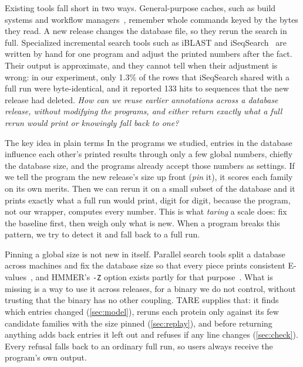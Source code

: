 \documentclass[letterpaper,twocolumn,10pt]{article}
\theoremstyle{definition}
\newcommand{\sys}{TARE\xspace}
\newcommand{\sys}{PARE\xspace}
\begin{document}
Existing tools fall short in two ways. General\nobreakdash-purpose caches, such as build systems and workflow
managers~\cite{curtsinger2022riker,xie2026incr,shiptoski2023processcache,ditommaso2017nextflow,molder2021snakemake},
remember whole commands keyed by the bytes they read. A new release changes the database file, so they rerun the
search in full. Specialized incremental search tools such as iBLAST and iSeqSearch~\cite{dash2021iblast,yoo2025iseqsearch}
are written by hand for one program and adjust the printed numbers after the fact. Their output is approximate, and
they cannot tell when their adjustment is wrong: in our experiment, only 1.3\% of the rows that iSeqSearch shared
with a full run were byte\nobreakdash-identical, and it reported 133 hits to sequences that the new release had deleted.
\textit{How can we reuse earlier annotations across a database release, without modifying the programs, and either
return exactly what a full rerun would print or knowingly fall back to one?}

\begin{plainbox}{The key idea in plain terms}
In the programs we studied, entries in the database influence each other's printed results through only a few
global numbers, chiefly the database size, and the programs already accept those numbers as settings. If we tell
the program the new release's size up front (\textit{pin} it), it scores each family on its own merits. Then we can
rerun it on a small subset of the database and it prints exactly what a full run would print, digit for digit,
because the program, not our wrapper, computes every number. This is what \textit{taring} a scale does: fix the
baseline first, then weigh only what is new. When a program breaks this pattern, we try to detect it and fall back to a
full run.
\end{plainbox}

Pinning a global size is not new in itself. Parallel search tools split a database across machines and fix the
database size so that every piece prints consistent E-values~\cite{darling2003mpiblast}, and HMMER's \texttt{-Z} option
exists partly for that purpose~\cite{eddy2011hmmer}. What is missing is a way to use it across releases, for a binary we
do not control, without trusting that the binary has no other coupling. \sys supplies that: it finds which entries
changed (\cref{sec:model}), reruns each protein only against its few candidate families with the size pinned
(\cref{sec:replay}), and before returning anything adds back entries it left out and refuses if any line changes
(\cref{sec:check}). Every refusal falls back to an ordinary full run, so users always receive the program's own output.
\end{document}
